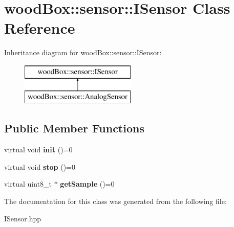 \hypertarget{classwood_box_1_1sensor_1_1_i_sensor}{}\section{wood\+Box\+:\+:sensor\+:\+:I\+Sensor Class Reference}
\label{classwood_box_1_1sensor_1_1_i_sensor}
Inheritance diagram for wood\+Box\+:\+:sensor\+:\+:I\+Sensor\+:\begin{figure}[H]
\begin{center}
\leavevmode
\includegraphics[height=2.000000cm]{classwood_box_1_1sensor_1_1_i_sensor}
\end{center}
\end{figure}
\subsection*{Public Member Functions}
\begin{DoxyCompactItemize}
\item 
\mbox{\label{classwood_box_1_1sensor_1_1_i_sensor_ac772909aea9d8556cdda19841d3bbc40}} 
virtual void {\bfseries init} ()=0
\item 
\mbox{\label{classwood_box_1_1sensor_1_1_i_sensor_a801f29792a0cd49bef0c54b346c570ad}} 
virtual void {\bfseries stop} ()=0
\item 
\mbox{\label{classwood_box_1_1sensor_1_1_i_sensor_a9de8041b991b76cc2f6fcc3b6a1bf363}} 
virtual uint8\+\_\+t $\ast$ {\bfseries get\+Sample} ()=0
\end{DoxyCompactItemize}


The documentation for this class was generated from the following file\+:\begin{DoxyCompactItemize}
\item 
I\+Sensor.\+hpp\end{DoxyCompactItemize}
